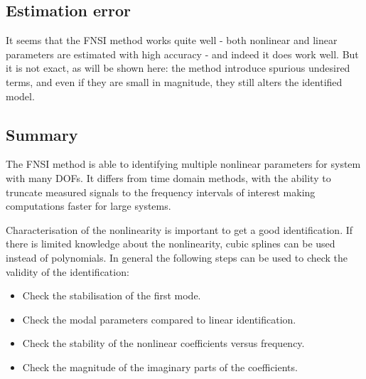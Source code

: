 \subsection{Estimation error}
\label{sec:fnsi-estimation-error}

It seems that the FNSI method works quite well - both nonlinear and linear
parameters are estimated with high accuracy - and indeed it does work well. But
it is not exact, as will be shown here: the method introduce spurious undesired
terms, and even if they are small in magnitude, they still alters the
identified model.



\subsection{Summary}
\label{sec:summary-fnsi}

The FNSI method is able to identifying multiple nonlinear parameters for system
with many DOFs. It differs from time domain methods, with the ability to
truncate measured signals to the frequency intervals of interest making
computations faster for large systems.

Characterisation of the nonlinearity is important to get a good identification.
If there is limited knowledge about the nonlinearity, cubic splines can be used
instead of polynomials.
In general the following steps can be used to check the validity of the
identification:

\begin{itemize}
\item Check the stabilisation of the first mode.
\item Check the modal parameters compared to linear identification.
\item Check the stability of the nonlinear coefficients versus frequency.
\item Check the magnitude of the imaginary parts of the coefficients.
\end{itemize}


